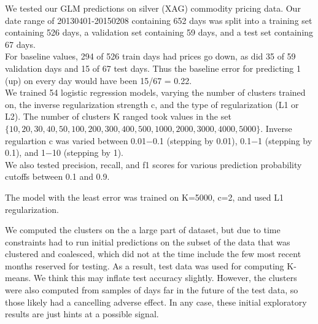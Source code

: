 We tested our GLM predictions on silver (XAG) commodity pricing data. Our date range of 20130401-20150208 containing 652 days was split into a training set containing 526 days, a validation set containing 59 days, and a test set containing 67 days.\\

For baseline values, 294 of 526 train days had prices go down, as did 35 of 59 validation days and 15 of 67 test days. Thus the baseline error for predicting 1 (up) on every day would have been 15/67 = 0.22.\\

We trained 54 logistic regression models, varying the number of clusters trained on, the inverse regularization strength c, and the type of regularization (L1 or L2). The number of clusters K ranged took values in the set $\{10,20,30,40,50,100,200,300,400,500,1000,2000,3000,4000,5000\}$. Inverse regulartion c was varied between 0.01−0.1 (stepping by 0.01), 0.1−1 (stepping by 0.1), and 1−10 (stepping by 1).\\

We also tested precision, recall, and f1 scores for various prediction probability cutoffs between 0.1 and 0.9.

The model with the least error was trained on K=5000, c=2, and used L1 regularization.

We computed the clusters on the a large part of dataset, but due to time constraints had to run initial predictions on the subset of the data that was clustered and coalesced, which did not at the time include the few most recent months reserved for testing. As a result, test data was used for computing K-means. We think this may inflate test accuracy slightly. However, the clusters were also computed from samples of days far in the future of the test data, so those likely had a cancelling adverse effect. In any case, these initial exploratory results are just hints at a possible signal.